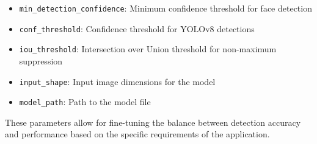 \begin{itemize}
    \item \texttt{min\_detection\_confidence}: Minimum confidence threshold for face detection
    \item \texttt{conf\_threshold}: Confidence threshold for YOLOv8 detections
    \item \texttt{iou\_threshold}: Intersection over Union threshold for non-maximum suppression
    \item \texttt{input\_shape}: Input image dimensions for the model
    \item \texttt{model\_path}: Path to the model file
\end{itemize}

These parameters allow for fine-tuning the balance between detection accuracy and performance based on the specific requirements of the application.